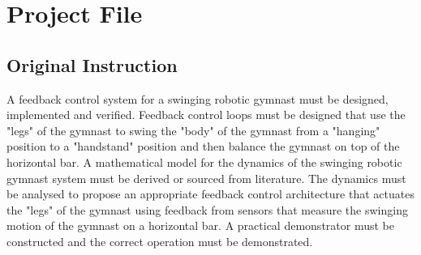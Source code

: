 \chapter{Project File}
\label{chp:intro}

\section{Original Instruction}
A feedback control system for a swinging robotic gymnast must be designed, implemented and verified. Feedback control loops must be designed that use the "legs" of the gymnast to swing the "body" of the gymnast from a "hanging" position to a "handstand" position and then balance the gymnast on top of the horizontal bar. A mathematical model for the dynamics of the swinging robotic gymnast system must be derived or sourced from literature. The dynamics must be analysed to propose an appropriate feedback control architecture that actuates the "legs" of the gymnast using feedback from sensors that measure the swinging motion of the gymnast on a horizontal bar. A practical demonstrator must be constructed and the correct operation must be demonstrated.























